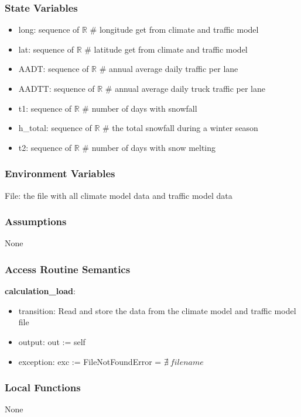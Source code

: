 \documentclass[12pt, titlepage]{article}
\begin{document}
\subsubsection{State Variables}
\begin{itemize}

\item long: sequence of $\mathbb{R}$ \# longitude get from climate and traffic model
\item lat: sequence of $\mathbb{R}$ \# latitude get from climate and traffic model
\item AADT: sequence of $\mathbb{R}$ \# annual average daily traffic per lane
\item AADTT: sequence of $\mathbb{R}$ \# annual average daily truck traffic per lane
\item t1: sequence of $\mathbb{R}$  \# number of days with snowfall
\item h\_total: sequence of $\mathbb{R}$ \# the total snowfall during a winter season
\item t2: sequence of $\mathbb{R}$  \# number of days with snow melting
\end{itemize}

\subsubsection{Environment Variables}
File: the file with all climate model data and traffic model data
\subsubsection{Assumptions}
None
\subsubsection{Access Routine Semantics}

\noindent \textbf{calculation\_load}:
\begin{itemize}
\item transition: Read and store the data from the climate model and traffic model file
\item output: out := self
\item exception: exc := FileNotFoundError = $\nexists ~ filename$
\end{itemize}

\subsubsection{Local Functions}
None
\newpage
\end{document}

